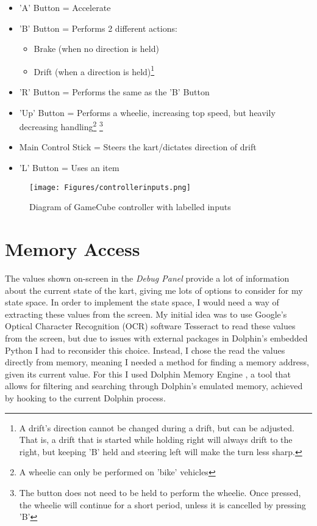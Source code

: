 \begin{itemize}
    \item 'A' Button = Accelerate
    \item 'B' Button = Performs 2 different actions:\begin{itemize}
        \item Brake (when no direction is held)
        \item Drift (when a direction is held)\footnote{A drift's direction cannot be changed during a drift, but can be adjusted. That is, a drift that is started while holding right will always drift to the right, but keeping 'B' held and steering left will make the turn less sharp.}
    \end{itemize}
    \item 'R' Button = Performs the same as the 'B' Button
    \item 'Up' Button = Performs a wheelie, increasing top speed, but heavily decreasing handling\footnote{A wheelie can only be performed on 'bike' vehicles} \footnote{The button does not need to be held to perform the wheelie. Once pressed, the wheelie will continue for a short period, unless it is cancelled by pressing 'B'}
    \item Main Control Stick = Steers the kart/dictates direction of drift
    \item 'L' Button = Uses an item
\end{itemize}
\begin{figure}[htb]
    \centering
    \texttt{[image: Figures/controllerinputs.png]}
    \caption{Diagram of GameCube controller with labelled inputs\cite{gc_diagram}}
    \label{fig:laballed-gc-diagram}
\end{figure}
\section{Memory Access}
The values shown on-screen in the \textit{Debug Panel} provide a lot of information about the current state of the kart, giving me lots of options to consider for my state space. In order to implement the state space, I would need a way of extracting these values from the screen. My initial idea was to use Google's Optical Character Recognition (OCR) software Tesseract \cite{google_tesseract} to read these values from the screen, but due to issues with external packages in Dolphin's embedded Python I had to reconsider this choice. Instead, I chose the read the values directly from memory, meaning I needed a method for finding a memory address, given its current value. For this I used Dolphin Memory Engine \cite{DolphinMemoryEngine}, a tool that allows for filtering and searching through Dolphin's emulated memory, achieved by hooking to the current Dolphin process.
